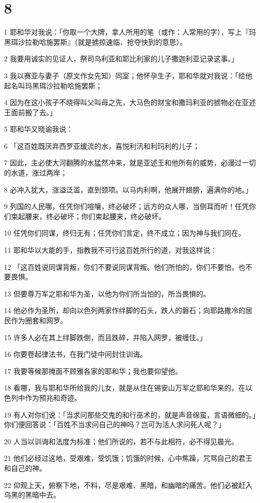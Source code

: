 \chapter{8}

\par 1 耶和华对我说：「你取一个大牌，拿人所用的笔（或作：人常用的字），写上『玛黑珥沙拉勒哈施罢斯』（就是掳掠速临、抢夺快到的意思）。
\par 2 我要用诚实的见证人，祭司乌利亚和耶比利家的儿子撒迦利亚记录这事。」
\par 3 我以赛亚与妻子（原文作女先知）同室；他怀孕生子，耶和华就对我说：「给他起名叫玛黑珥沙拉勒哈施罢斯；
\par 4 因为在这小孩子不晓得叫父叫母之先，大马色的财宝和撒玛利亚的掳物必在亚述王面前搬了去。」
\par 5 耶和华又晓谕我说：
\par 6 「这百姓既厌弃西罗亚缓流的水，喜悦利汛和利玛利的儿子；
\par 7 因此，主必使大河翻腾的水猛然冲来，就是亚述王和他所有的威势，必漫过一切的水道，涨过两岸；
\par 8 必冲入犹大，涨溢泛滥，直到颈项。以马内利啊，他展开翅膀，遍满你的地。」
\par 9 列国的人民哪，任凭你们喧嚷，终必破坏；远方的众人哪，当侧耳而听！任凭你们束起腰来，终必破坏；你们束起腰来，终必破坏。
\par 10 任凭你们同谋，终归无有；任凭你们言定，终不成立；因为神与我们同在。
\par 11 耶和华以大能的手，指教我不可行这百姓所行的道，对我这样说：
\par 12 「这百姓说同谋背叛，你们不要说同谋背叛。他们所怕的，你们不要怕，也不要畏惧。
\par 13 但要尊万军之耶和华为圣，以他为你们所当怕的，所当畏惧的。
\par 14 他必作为圣所，却向以色列两家作绊脚的石头，跌人的磐石；向耶路撒冷的居民作为圈套和网罗。
\par 15 许多人必在其上绊脚跌倒，而且跌碎，并陷入网罗，被缠住。」
\par 16 你要卷起律法书，在我门徒中间封住训诲。
\par 17 我要等候那掩面不顾雅各家的耶和华；我也要仰望他。
\par 18 看哪，我与耶和华所给我的儿女，就是从住在锡安山万军之耶和华来的，在以色列中作为预兆和奇迹。
\par 19 有人对你们说：「当求问那些交鬼的和行巫术的，就是声音绵蛮，言语微细的。」你们便回答说：「百姓不当求问自己的神吗？岂可为活人求问死人呢？」
\par 20 人当以训诲和法度为标准；他们所说的，若不与此相符，必不得见晨光。
\par 21 他们必经过这地，受艰难，受饥饿；饥饿的时候，心中焦躁，咒骂自己的君王和自己的神。
\par 22 仰观上天，俯察下地，不料，尽是艰难、黑暗，和幽暗的痛苦。他们必被赶入乌黑的黑暗中去。

